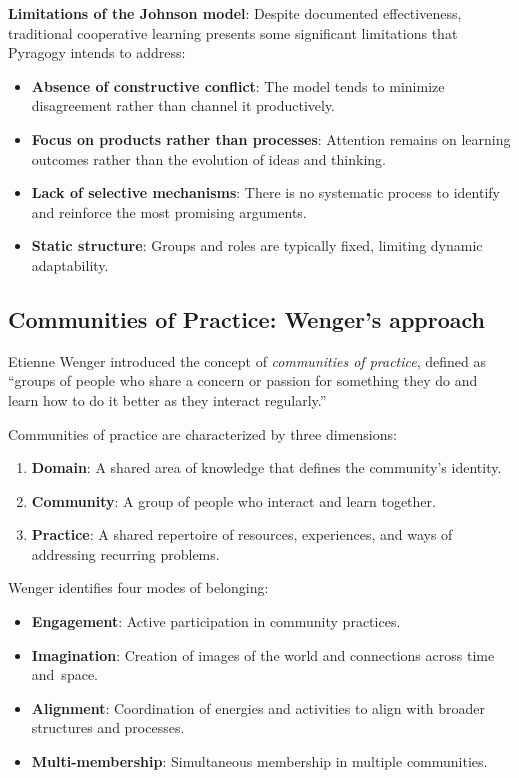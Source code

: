 \textbf{Limitations of the Johnson model}:
Despite documented effectiveness, traditional cooperative learning presents some significant limitations that Pyragogy intends to address:

\begin{itemize}
	\item \textbf{Absence of constructive conflict}: The model tends to minimize disagreement rather than channel it productively.
	\item \textbf{Focus on products rather than processes}: Attention remains on learning outcomes rather than the evolution of ideas and thinking.
	\item \textbf{Lack of selective mechanisms}: There is no systematic process to identify and reinforce the most promising arguments.
	\item \textbf{Static structure}: Groups and roles are typically fixed, limiting dynamic adaptability.
\end{itemize}

\subsection{Communities of Practice: Wenger's approach}

Etienne Wenger \cite{Wenger1998} introduced the concept of \textit{communities of practice}, defined as ``groups of people who share a concern or passion for something they do and learn how to do it better as they interact regularly.''

Communities of practice are characterized by three dimensions:

\begin{enumerate}
	\item \textbf{Domain}: A shared area of knowledge that defines the community's identity.
	\item \textbf{Community}: A group of people who interact and learn together.
	\item \textbf{Practice}: A shared repertoire of resources, experiences, and ways of addressing recurring problems.
\end{enumerate}

Wenger identifies four modes of belonging:

\begin{itemize}
	\item \textbf{Engagement}: Active participation in community practices.
	\item \textbf{Imagination}: Creation of images of the world and connections across time and~space.
	\item \textbf{Alignment}: Coordination of energies and activities to align with broader structures and processes.
	\item \textbf{Multi-membership}: Simultaneous membership in multiple communities. 
\end{itemize}

